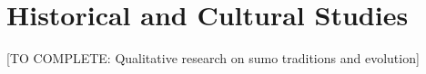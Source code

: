 \section{Historical and Cultural Studies}

[TO COMPLETE: Qualitative research on sumo traditions and evolution]